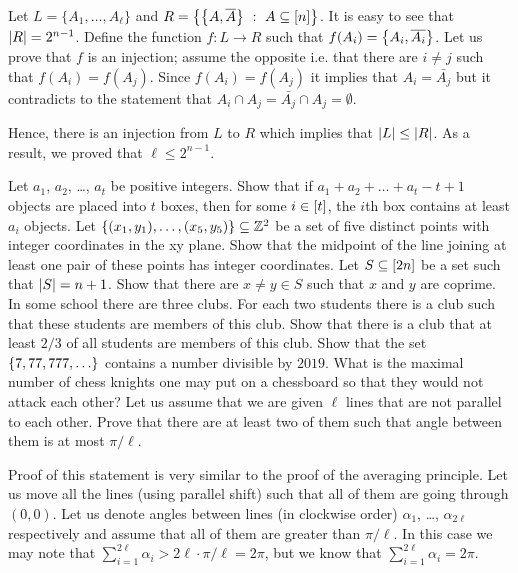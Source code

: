 \begin{chapterendexercises}
\begin{solution}
      Let $L = \{A_1, \dots, A_\ell\}$ and
      $R = \set[A \subseteq \range{n}]{\set{A, \bar{A}}}$. It is easy to see
      that $\left|{R}\right| = 2^{n - 1}$. Define the function $f : L \to R$ such that 
      $f(A_i) = \set{A_i, \bar{A_i}}$. Let us prove that $f$ is an injection; 
      assume the opposite i.e. that there are $i \neq j$ such that 
      $f(A_i) = f(A_j)$. Since $f(A_i) = f(A_j)$ it implies that $A_i =
      \bar{A_j}$ but it contradicts to the statement that $A_i \cap A_j =
      \bar{A_j} \cap A_j = \emptyset$.

      Hence, there is an injection from $L$ to $R$ which implies that
      $\left|{L}\right| \le \left|{R}\right|$.
      As a result, we proved that $\ell \le 2^{n - 1}$.
    \end{solution}
  \exercise[recommended] Let $a_1$, $a_2$, \dots, $a_t$ be positive integers. Show that
    if $a_1 + a_2 + \dots + a_t - t + 1$ objects are placed into $t$ boxes,
    then for some $i \in {[{t}]}$, the $i$th box contains at least $a_i$ objects.
  \exercise Let $\set{(x_1,y_1), \dots, (x_5, y_5)} \subseteq \Z^2$ be a
    set of five distinct points with integer coordinates in the xy plane. Show
    that the midpoint of the line joining at least one pair of these points has
    integer coordinates.
  \exercise Let $S \subseteq {[{2n}]}$ be a set such that 
    $\left|{S}\right| = n + 1$. Show
    that there are $x \neq y \in S$ such that $x$ and $y$ are coprime.
  \exercise[recommended] In some school there are three clubs. For each two
    students there is a club such that these students are  members of this club.
    Show that there is a club that at least $2 / 3$ of all students are members
    of this club.
  \exercise Show that the set $\set{7, 77, 777, \dots}$ contains a number
    divisible by $2019$.
  \exercise What is the maximal number of chess knights one may put on a
    chessboard so that they would not attack each other?
  \exercise[recommended] Let us assume that we are given $\ell$ lines that are
    not parallel to each other. Prove that there are at least two of them such
    that angle between them is at most $\pi / \ell$.
    \begin{solution}
      Proof of this statement is very similar to the proof of the averaging
      principle.
      Let us move all the lines (using parallel shift) such that all of them are
      going through $(0, 0)$. Let us denote angles between lines (in clockwise
      order) $\alpha_1$, \dots, $\alpha_{2\ell}$ respectively and assume that
      all of them are greater than $\pi / \ell$. In this case we may note that
      $\sum\limits_{i = 1}^{2\ell} \alpha_i > 2\ell \cdot \pi / \ell = 2\pi$,
      but we know that $\sum\limits_{i = 1}^{2\ell} \alpha_i  = 2\pi$.
    \end{solution}
\end{chapterendexercises}
